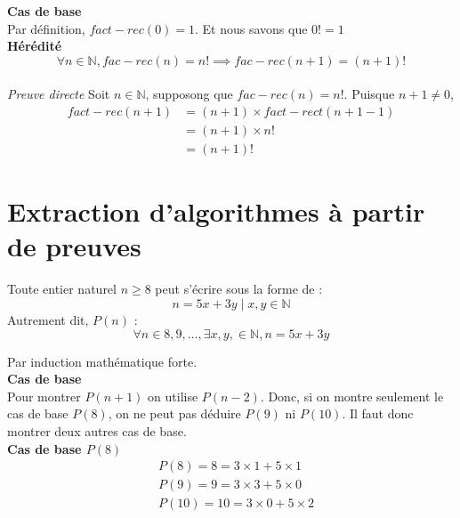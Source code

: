 \documentclass[16pt]{report}
\begin{document}
\begin{multicols*}{2}
\begin{Preuve}{}{}
                \textbf{Cas de base} \\ 
                Par définition, $fact-rec(0) = 1$. Et nous savons que $0! = 1$ \\ \vspace{2em} 
                \textbf{Hérédité}  
                \[ \forall n \in \mathbb{N}, fac-rec(n) = n! \implies fac-rec(n+1) = (n+1)! \]
            \\ \vspace{2em}
            \textit{Preuve directe}
            Soit $n \in \mathbb{N}$, supposong que $fac-rec(n) = n!$. Puisque $n+1 \neq 0$,  
            \begin{align*}
                fact-rec(n+1) &= (n+1) \times fact-rect(n+1-1) \\ 
                        &= (n+1) \times n! \\ 
                        &= (n+1)!
            \end{align*}
            \end{Preuve}
            \section{Extraction d'algorithmes à partir de preuves} 
        


            \begin{Theoremcon}{}
                Toute entier naturel $n \geq 8$ peut s'écrire sous la forme de : 
                \[ n = 5x +3y \; | \; x, y \in \mathbb{N}\]
                Autrement dit, $P(n)$ : 
                \[ \forall n \in {8, 9, \dots}, \exists x, y, \in \mathbb{N}, n = 5x +3y \]
            \end{Theoremcon}


            \begin{Preuve}{}{}
                Par induction mathématique forte. \\ 
                \textbf{Cas de base} \\         
                Pour montrer $P(n+1)$ on utilise $P(n-2)$. Donc, si on montre seulement
                le cas de base $P(8)$, on ne peut pas déduire $P(9)$ ni $P(10)$. Il faut donc montrer deux autres 
                cas de base. \\ 

                \textbf{Cas de base $P(8)$}  \\
                \begin{align*}
                            &P(8) = 8 =  3 \times 1 + 5 \times 1 \\ 
                            &P(9) = 9 = 3 \times 3 + 5 \times 0  \\ 
                            &P(10) = 10 = 3 \times 0 + 5 \times 2  \\
                \end{align*}


\end{Preuve}
\end{multicols*}
\end{document}
